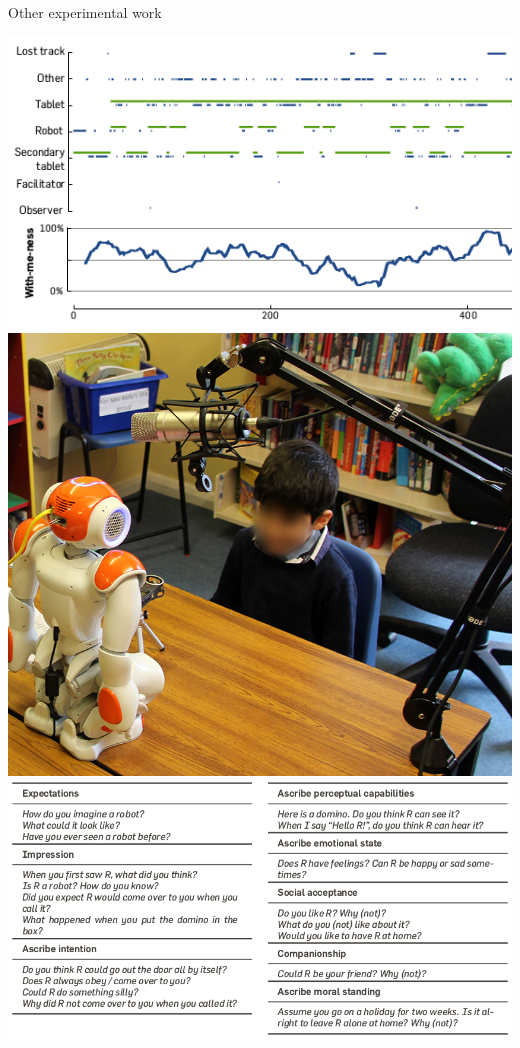 \documentclass[xcolor=table]{beamer}
\begin{document}
\begin{frame}{Other experimental work}
            \hyperlink{withmeness}{\includegraphics[height=0.2\paperheight]{withmeness/withmeness}}
            \hspace{0.5em}
            \hyperlink{asr}{\includegraphics[height=0.2\paperheight]{speech-reco/record_img}}
            \hspace{0.5em}
            \hyperlink{constructs}{\includegraphics[height=0.2\paperheight]{ranger/questionnaire}}

\end{frame}
\end{document}
